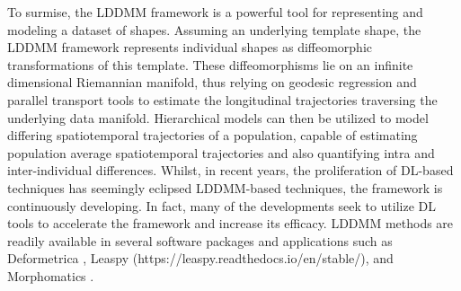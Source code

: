 					To surmise, the LDDMM framework is a powerful tool for representing and modeling a dataset of shapes. Assuming an underlying template shape, the LDDMM framework represents individual shapes as diffeomorphic transformations of this template. These diffeomorphisms lie on an infinite dimensional Riemannian manifold, thus relying on geodesic regression and parallel transport tools to estimate the longitudinal trajectories traversing the underlying data manifold. Hierarchical models can then be utilized to model differing spatiotemporal trajectories of a population, capable of estimating population average spatiotemporal trajectories and also quantifying intra and inter-individual differences. Whilst, in recent years, the proliferation of DL-based techniques has seemingly eclipsed LDDMM-based techniques, the framework is continuously developing. In fact, many of the developments seek to utilize DL tools to accelerate the framework and increase its efficacy. LDDMM methods are readily available in several software packages and applications such as Deformetrica \cite{Bne2018}, Leaspy (https://leaspy.readthedocs.io/en/stable/), and Morphomatics \cite{Morphomatics}.  
					